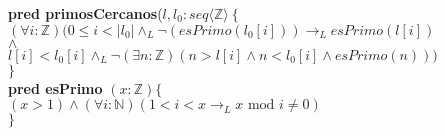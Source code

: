 \documentclass[a4paper]{article}
\begin{document}
			\textbf{pred primosCercanos}($l,l_0: seq\langle\mathbb{Z}\rangle
			\ \{$\smallskip \\
			\hspace*{6mm}$(\forall i:\mathbb{Z})(0\leq i<|l_0|\wedge_L\neg(esPrimo(l_0[i]))
			\rightarrow_L esPrimo(l[i])$\\
			\hspace*{6mm}$\wedge $\\
			\hspace*{6mm}$l[i]<l_0[i]\wedge_L \neg(\exists n:\mathbb{Z})(n>l[i]\wedge
			n<l_0[i]\wedge esPrimo(n)))$\\
			\hspace*{5mm}$\}$\smallskip \\
			
			\textbf{pred esPrimo} $(x: \mathbb{Z})\{$\\ 
			\hspace*{6mm}$ (x > 1)\wedge(\forall i :\mathbb{N})
			(1<i<x \rightarrow _L x\textrm{ mod }i\neq 0 )$\\
			\hspace*{5mm}$\}$
\end{document}
